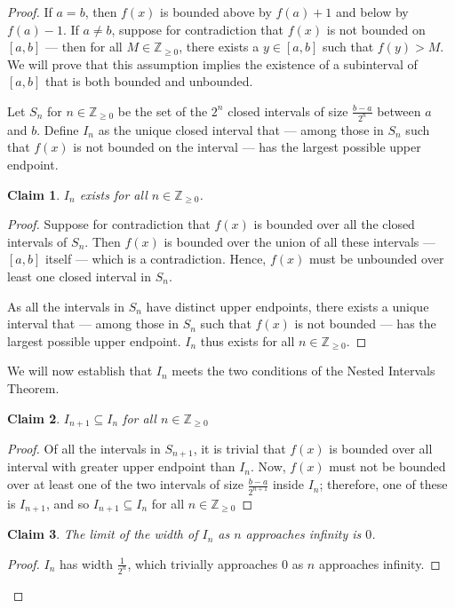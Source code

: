 \documentclass[11pt]{article}
\newtheorem*{claim*}{Claim}
\begin{document}
\begin{proof}

If $a = b$, then $f(x)$ is bounded above by $f(a) + 1$ and below by $f(a) - 1$. If $a \ne b$, suppose for contradiction that $f(x)$ is not bounded on $[a, b]$ --- then for all $M \in \mathbb{Z}_{\ge 0}$, there exists a $y \in [a, b]$ such that $f(y) > M$. We will prove that this assumption implies the existence of a subinterval of $[a, b]$ that is both bounded and unbounded.

Let $S_n$ for $n \in \mathbb{Z}_{\ge 0}$ be the set of the $2^{n}$ closed intervals of size $\tfrac{b-a}{2^{n}}$ between $a$ and $b$. Define $I_n$ as the unique closed interval that --- among those in $S_n$ such that $f(x)$ is not bounded on the interval --- has the largest possible upper endpoint.

\begin{adjustwidth}{1cm}{}
    \begin{claim*}
    	$I_n$ exists for all $n \in \mathbb{Z}_{\ge 0}$.
    \end{claim*}
    \begin{proof}\renewcommand{\qedsymbol}{}	
		Suppose for contradiction that $f(x)$ is bounded over all the closed intervals of $S_{n}$. Then $f(x)$ is bounded over the union of all these intervals --- $[a, b]$ itself --- which is a contradiction. Hence, $f(x)$ must be unbounded over least one closed interval in $S_{n}$.

		As all the intervals in $S_n$ have distinct upper endpoints, there exists a unique interval that --- among those in $S_{n}$ such that $f(x)$ is not bounded --- has the largest possible upper endpoint. $I_n$ thus exists for all $n \in \mathbb{Z}_{\ge 0}$.
    \end{proof}
\end{adjustwidth}

We will now establish that $I_n$ meets the two conditions of the Nested Intervals Theorem. 

\begin{adjustwidth}{1cm}{}
	\begin{claim*}
		$I_{n+1} \subseteq I_n$ for all $n \in \mathbb{Z}_{\ge 0}$
	\end{claim*}
	\begin{proof}\renewcommand{\qedsymbol}{}
		Of all the intervals in $S_{n+1}$, it is trivial that $f(x)$ is bounded over all interval with greater upper endpoint than $I_n$. Now, $f(x)$ must not be bounded over at least one of the two intervals of size $\tfrac{b-a}{2^{n+1}}$ inside $I_n$; therefore, one of these is $I_{n+1}$, and so $I_{n+1} \subseteq I_{n}$ for all $n \in \mathbb{Z}_{\ge 0}$ 
	\end{proof}
	\begin{claim*}
		The limit of the width of $I_n$ as $n$ approaches infinity is $0$.
	\end{claim*}
	\begin{proof}\renewcommand{\qedsymbol}{}
		$I_n$ has width $\tfrac{1}{2^{n}}$, which trivially approaches $0$ as $n$ approaches infinity.
	\end{proof}
\end{adjustwidth}


\end{proof}
\end{document}
